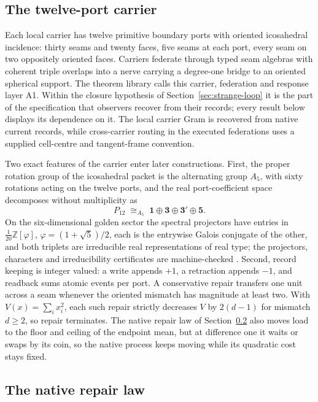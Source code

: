 \documentclass[11pt]{article}
\theoremstyle{definition}
\theoremstyle{remark}
\begin{document}
\subsection{The twelve-port carrier}

Each local carrier has twelve primitive boundary ports with oriented
icosahedral incidence: thirty seams and twenty faces, five seams at each
port, every seam on two oppositely oriented faces. Carriers federate through
typed seam algebras with coherent triple overlaps into a nerve carrying a
degree-one bridge to an oriented spherical support. The theorem library
calls this carrier, federation and response layer A1. Within the closure
hypothesis of Section~\ref{sec:strange-loop} it is the part of the
specification that observers recover from their records; every result below
displays its dependence on it. The local carrier Gram is recovered from
native current records, while cross-carrier routing in the executed
federations uses a supplied cell-centre and tangent-frame convention.

Two exact features of the carrier enter later constructions. First, the
proper rotation group of the icosahedral packet is the alternating group
$A_{5}$, with sixty rotations acting on the twelve ports, and the real
port-coefficient space decomposes without multiplicity as
\begin{equation}
P_{12}\;\cong_{A_5}\;\mathbf 1\oplus\mathbf 3\oplus\mathbf 3'\oplus\mathbf 5 .
\label{eq:bands}
\end{equation}
On the six-dimensional golden sector the spectral projectors have entries in
$\tfrac1{20}\mathbb Z[\varphi]$, $\varphi=(1+\sqrt5)/2$, each is the
entrywise Galois conjugate of the other, and both triplets are irreducible
real representations of real type; the projectors, characters and
irreducibility certificates are machine-checked
\cite{serre1977,ophrepo}. Second, record keeping is integer valued: a write
appends $+1$, a retraction appends $-1$, and readback sums atomic events per
port. A conservative repair transfers one unit across a seam whenever the
oriented mismatch has magnitude at least two. With $V(x)=\sum_ix_i^{2}$, each such repair strictly decreases $V$ by $2(d-1)$ for mismatch $d\ge 2$,
so repair terminates. The native repair law of
Section~\ref{sec:native-repair} also moves load to the floor and ceiling of
the endpoint mean, but at difference one it waits or swaps by its coin, so
the native process keeps moving while its quadratic cost stays fixed.

\subsection{The native repair law}
\label{sec:native-repair}
\end{document}
